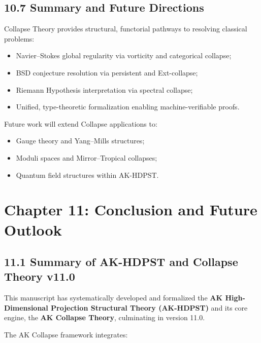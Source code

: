\documentclass[11pt]{article}
\begin{document}
\subsection*{10.7 Summary and Future Directions}

Collapse Theory provides structural, functorial pathways to resolving classical problems:

\begin{itemize}
    \item Navier–Stokes global regularity via vorticity and categorical collapse;
    \item BSD conjecture resolution via persistent and Ext-collapse;
    \item Riemann Hypothesis interpretation via spectral collapse;
    \item Unified, type-theoretic formalization enabling machine-verifiable proofs.
\end{itemize}

Future work will extend Collapse applications to:

\begin{itemize}
    \item Gauge theory and Yang–Mills structures;
    \item Moduli spaces and Mirror–Tropical collapses;
    \item Quantum field structures within AK-HDPST.
\end{itemize}



\section{Chapter 11: Conclusion and Future Outlook}

\subsection*{11.1 Summary of AK-HDPST and Collapse Theory v11.0}

This manuscript has systematically developed and formalized the \textbf{AK High-Dimensional Projection Structural Theory (AK-HDPST)} and its core engine, the \textbf{AK Collapse Theory}, culminating in version 11.0.

The AK Collapse framework integrates:
\end{document}
